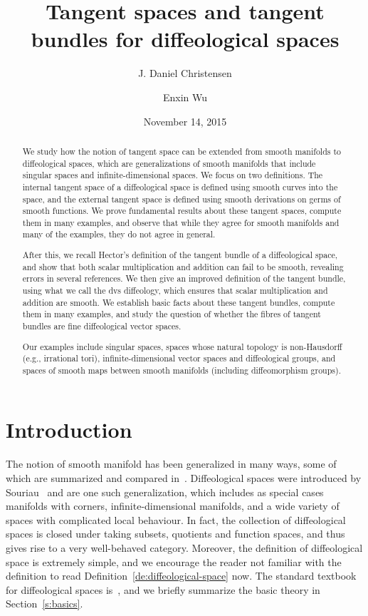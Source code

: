 \documentclass[12pt]{amsart}
\title{Tangent spaces and tangent bundles \break for diffeological spaces}
\author{J. Daniel Christensen}
\author{Enxin Wu}
\date{November 14, 2015}
\theoremstyle{remark}
\begin{document}
%
%
%
%
%
%
%
%
%
%


\begin{abstract}
We study how the notion of tangent space can be extended from smooth
manifolds to diffeological spaces, which are generalizations of smooth
manifolds that include singular spaces and infinite-dimensional spaces.
We focus on two definitions.
The internal tangent space of a diffeological space is defined using
smooth curves into the space,
and the external tangent space is defined using smooth derivations on germs of smooth functions.
We prove fundamental results about these tangent spaces,
compute them in many examples, and observe
that while they agree for smooth manifolds and many of the examples, they
do not agree in general.

After this, we recall Hector's definition of the tangent bundle of a diffeological space,
and show that both scalar multiplication and addition can fail to be smooth,
revealing errors in several references.
We then give an improved definition of the tangent bundle, using what
we call the dvs diffeology, which ensures that scalar multiplication
and addition are smooth.
We establish basic facts about these tangent bundles, compute
them in many examples, and study the question of whether the fibres
of tangent bundles are fine diffeological vector spaces.

Our examples include singular spaces,
spaces whose natural topology is non-Hausdorff (e.g., irrational tori),
infinite-dimensional vector spaces and diffeological groups,
and spaces of smooth maps between smooth manifolds (including diffeomorphism groups).
\end{abstract}

\maketitle
\newpage
\tableofcontents
\newpage
\section{Introduction}

The notion of smooth manifold has been generalized in many ways, some
of which are summarized and compared in~\cite{St}.
Diffeological spaces were introduced by Souriau~\cite{So1,So2}
and are one such generalization, which includes as special cases
manifolds with corners, infinite-dimensional manifolds,
and a wide variety of spaces with complicated local behaviour.
In fact, the collection of diffeological spaces is closed under taking
subsets, quotients and function spaces, and thus gives rise to
a very well-behaved category.
Moreover, the definition of diffeological space is extremely simple,
and we encourage the reader not familiar with the definition to
read Definition~\ref{de:diffeological-space} now.
The standard textbook for diffeological spaces is~\cite{I3},
and we briefly summarize the basic theory in Section~\ref{s:basics}.
\end{document}
